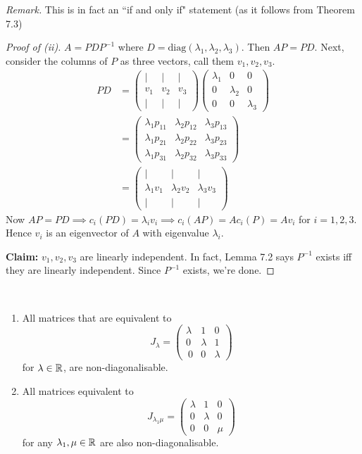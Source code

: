\documentclass[10pt]{scrartcl}
\begin{document}
\emph{Remark.} This is in fact an ``if and only if" statement (as it follows from Theorem 7.3)

\begin{proof}[Proof of (ii)]
$A = PDP^{-1}$ where $D = \mathrm{diag}(\lambda_1,\lambda_2,\lambda_3)$. Then $AP = PD$. Next, consider the columns of $P$ as three vectors, call them $v_1,v_2,v_3$. 
\begin{align*}
  PD &= \begin{pmatrix}
 | & | & | \\ v_1 & v_2 & v_3 \\ | & | & |	
 \end{pmatrix}\begin{pmatrix}
 \lambda_1 & 0 & 0\\ 0 & \lambda_2 & 0\\ 0 & 0 & \lambda_3	
 \end{pmatrix}\\
 &= 
 \begin{pmatrix}
 \lambda_1p_{11} & \lambda_2p_{12} & \lambda_3p_{13}\\
 \lambda_1p_{21} & \lambda_2p_{22} & \lambda_3p_{23}\\
 \lambda_1p_{31} & \lambda_2p_{32} & \lambda_3p_{33}	
 \end{pmatrix}\\
 &= \begin{pmatrix}
  | & | & | \\ \lambda_1v_1 & \lambda_2v_2 & \lambda_3v_3 \\ | & | & |		
 \end{pmatrix}
\end{align*}
Now $AP = PD \implies c_i(PD) = \lambda_iv_i \implies c_i(AP) = Ac_i(P) = Av_i$ for $i = 1,2,3$. Hence $v_i$ is an eigenvector of $A$ with eigenvalue $\lambda_i$. 

\textbf{Claim:} $v_1,v_2,v_3$ are linearly independent. In fact, Lemma 7.2 says $P^{-1}$ exists iff they are linearly independent. Since $P^{-1}$ exists, we're done.
\end{proof}\vsp


\begin{corollary}~\\[-.2cm]
\begin{enumerate}
\item All matrices that are equivalent to 
\[
  J_\lambda = \begin{pmatrix}
 \lambda & 1 & 0\\ 0 & \lambda & 1\\\ 0 & 0 & \lambda 	
 \end{pmatrix}
\]
for $\lambda \in\mathbb{R}$, are non-diagonalisable.
\item All matrices equivalent to 
\[
  J_{\lambda_1\mu} = \begin{pmatrix}
 \lambda & 1 & 0\\ 0 & \lambda & 0 \\ 0 & 0 & \mu 	
 \end{pmatrix}
 \]
 for any $\lambda_1,\mu \in\mathbb{R}$ are also non-diagonalisable.
\end{enumerate}
\end{corollary}
\end{document}
